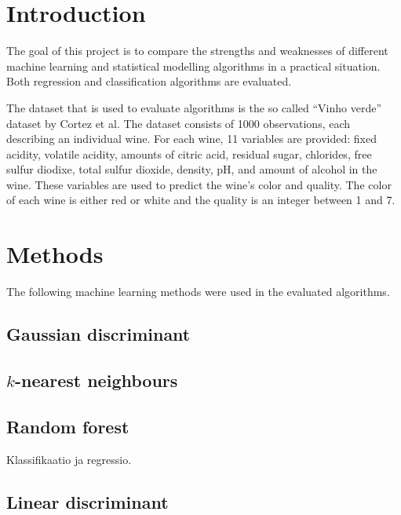 \documentclass[twoside]{article}
\begin{document}
\begin{multicols}{2} %

\section{Introduction}

The goal of this project is to compare the strengths and weaknesses of different machine learning
and statistical modelling algorithms in a practical situation. Both regression and classification
algorithms are evaluated.

The dataset that is used to evaluate algorithms is the so called ``Vinho verde'' dataset by Cortez et al\cite{CorCer09}.
The dataset consists of 1000 observations, each describing an individual wine. For each wine, 11 variables are provided:
fixed acidity, volatile acidity, amounts of citric acid, residual sugar, chlorides, free sulfur diodixe, total sulfur dioxide,
density, pH, and amount of alcohol in the wine. These variables are used to predict the wine's color and quality.
The color of each wine is either red or white and the quality is an integer between 1 and 7.


\section{Methods}

The following machine learning methods were used in the evaluated algorithms.

\subsection{Gaussian discriminant}

\subsection{$k$-nearest neighbours}

\subsection{Random forest}

Klassifikaatio ja regressio.

\subsection{Linear discriminant}


\end{multicols}
\end{document}
